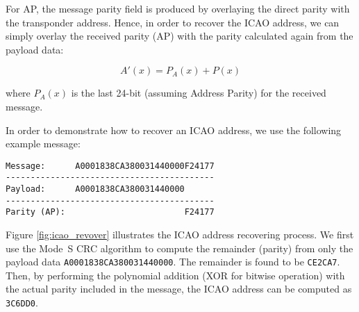 For AP, the message parity field is produced by overlaying the direct parity with the transponder address. Hence, in order to recover the ICAO address, we can simply overlay the received parity (AP) with the parity calculated again from the payload data:

\begin{equation}
  A'(x) = P_A(x) + P(x)
\end{equation}

\noindent where $P_A(x)$ is the last 24-bit (assuming Address Parity) for the received message.

In order to demonstrate how to recover an ICAO address, we use the following example message:

\begin{verbatim}
Message:      A0001838CA380031440000F24177
------------------------------------------
Payload:      A0001838CA380031440000
------------------------------------------
Parity (AP):                        F24177
\end{verbatim}

Figure \ref{fig:icao_revover} illustrates the ICAO address recovering process. We first use the Mode~S CRC algorithm to compute the remainder (parity) from only the payload data \texttt{A0001838CA380031440000}. The remainder is found to be \texttt{CE2CA7}. Then, by performing the polynomial addition (XOR for bitwise operation) with the actual parity included in the message, the ICAO address can be computed as \texttt{3C6DD0}.

